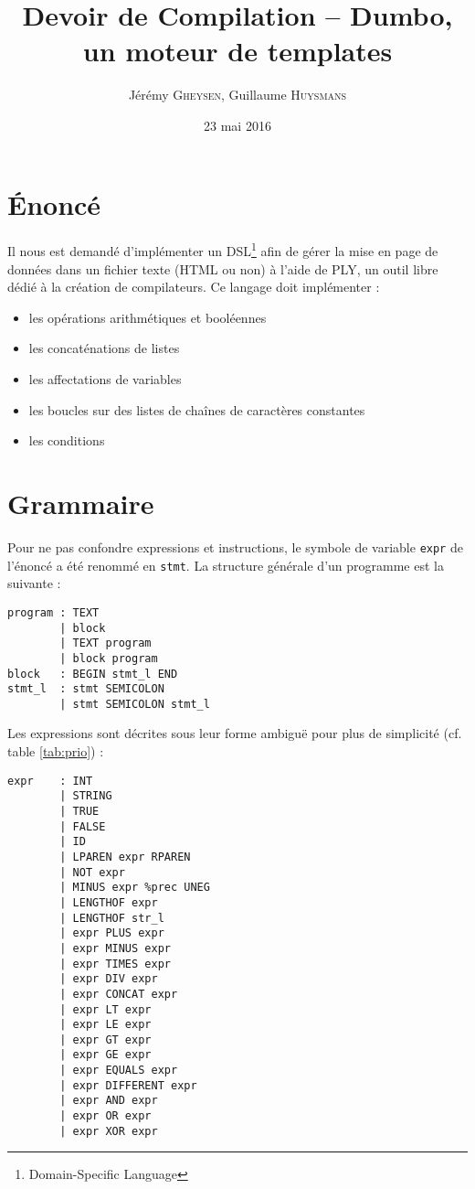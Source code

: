 \documentclass[12pt,twocolumn]{article}
\title{Devoir de Compilation -- Dumbo, un moteur de templates}
\author{Jérémy \textsc{Gheysen}, Guillaume \textsc{Huysmans}}
\date{23 mai 2016}
\begin{document}
\maketitle


\section{Énoncé}
Il nous est demandé d'implémenter un DSL\footnote{Domain-Specific Language}
afin de gérer la mise en page de données dans un fichier texte (HTML ou non)
à l'aide de PLY, un outil libre dédié à la création de compilateurs.
Ce langage doit implémenter :
\begin{itemize}
\item les opérations arithmétiques et booléennes
\item les concaténations de listes
\item les affectations de variables
\item les boucles sur des listes de chaînes de caractères constantes
\item les conditions
\end{itemize}


\section{Grammaire}
Pour ne pas confondre expressions et instructions, le symbole de variable
\texttt{expr} de l'énoncé a été renommé en \texttt{stmt}.
La structure générale d'un programme est la suivante :
\begin{verbatim}
program : TEXT
        | block
        | TEXT program
        | block program
block   : BEGIN stmt_l END
stmt_l  : stmt SEMICOLON
        | stmt SEMICOLON stmt_l
\end{verbatim}

Les expressions sont décrites
sous leur forme ambiguë pour plus de simplicité
(cf. table \ref{tab:prio}) :
\begin{verbatim}
expr    : INT
        | STRING
        | TRUE
        | FALSE
        | ID
        | LPAREN expr RPAREN
        | NOT expr
        | MINUS expr %prec UNEG
        | LENGTHOF expr
        | LENGTHOF str_l
        | expr PLUS expr
        | expr MINUS expr
        | expr TIMES expr
        | expr DIV expr
        | expr CONCAT expr
        | expr LT expr
        | expr LE expr
        | expr GT expr
        | expr GE expr
        | expr EQUALS expr
        | expr DIFFERENT expr
        | expr AND expr
        | expr OR expr
        | expr XOR expr
\end{verbatim}
\end{document}
